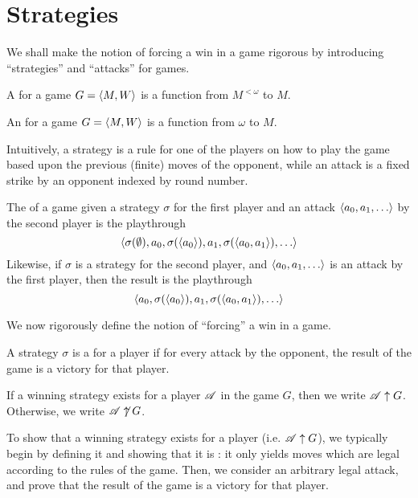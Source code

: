 \section{Strategies}

We shall make the notion of forcing a win in a game rigorous by introducing
``strategies'' and ``attacks'' for games.

\begin{defn}
  A  for a game $G=\langle M,W\rangle$ is a function
  from $M^{<\omega}$ to $M$.
\end{defn}

\begin{defn}
  An  for a game $G=\langle M,W\rangle$ is a function
  from $\omega$ to $M$.
\end{defn}

Intuitively, a strategy is a rule for one of the players on how to play
the game based upon the previous (finite) moves of the opponent, while an
attack is a fixed strike by an opponent indexed by round number.


\begin{defn}
  The  of a game given a strategy $\sigma$ for the first player
  and an attack $\<a_0,a_1,\dots\>$ by the second player is the playthrough
    \[
      \<
        \sigma(\emptyset),
        a_0,
        \sigma(\<a_0\>),
        a_1,
        \sigma(\<a_0,a_1\>),
        \dots
      \>
    \]
  Likewise, if $\sigma$ is a strategy for the second player, and
  $\<a_0,a_1,\dots\>$ is an attack by the first player, then the result is
  the playthrough
    \[
      \<
        a_0,
        \sigma(\<a_0\>),
        a_1,
        \sigma(\<a_0,a_1\>),
        \dots
      \>
    \]
\end{defn}

We now rigorously define the notion of ``forcing'' a win in a game.

\begin{defn}
  A strategy $\sigma$ is a  for a player if for
  every attack by the opponent, the result of the game is a victory
  for that player.

  If a winning strategy exists for a player $\mathscr{A}$ in the game $G$, then we
  write $\mathscr{A} \uparrow G$. Otherwise, we write $\mathscr{A} \not\uparrow G$.
\end{defn}

To show that a winning strategy exists for a player (i.e. $\mathscr{A}\uparrow G$),
we typically begin by
defining it and showing that it is : it only yields moves which are
legal according to the rules of the game. Then, we consider an arbitrary
legal attack, and prove that the result of the game is a victory for that
player.

